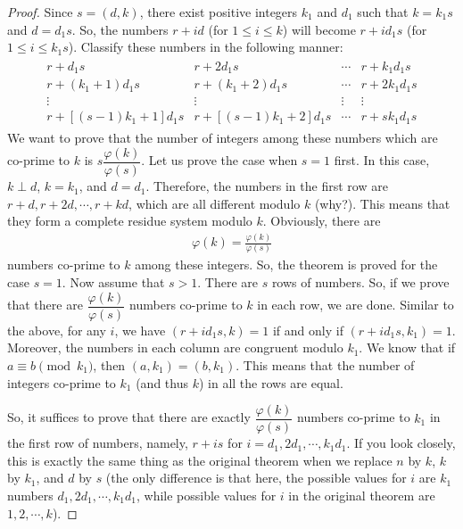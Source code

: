 \begin{proof}
		Since $s=(d,k)$, there exist positive integers $k_1$ and $d_1$ such that $k = k_1s$ and $d = d_1s$. So, the numbers $r+id$ (for $1 \leq  i \leq k$) will become $r+id_1s$ (for $1 \leq i \leq k_1s$). Classify these numbers in the following manner:
			\begin{align*}
			 \begin{matrix}
				 r+d_1s&r+2d_1s&\cdots&r+k_1d_1s\\
				 r+(k_1+1)d_1s&r+(k_1+2)d_1s&\cdots&r+2k_1d_1s\\
				 \vdots&\vdots&\vdots&\vdots\\
				 r+[(s-1)k_1+1]d_1s&r+[(s-1)k_1+2]d_1s&\cdots&r+sk_1d_1s
			 \end{matrix}
			\end{align*}
		We want to prove that the number of integers among these numbers which are co-prime to $k$ is $s \dfrac{\varphi(k)}{\varphi(s)}$. Let us prove the case when $s=1$ first. In this case, $k \perp d$, $k=k_1$, and $d=d_1$. Therefore, the numbers in the first row are $r+d, r+2d, \cdots, r+kd$, which are all different modulo $k$ (why?). This means that they form a complete residue system modulo $k$. Obviously, there are
			\begin{align*}
				\varphi(k) = \frac{\varphi(k)}{\varphi(s)}
			\end{align*}
		numbers co-prime to $k$ among these integers. So, the theorem is proved for the case $s=1$.
		Now assume that $s>1$. There are $s$ rows of numbers. So, if we prove that there are $\dfrac{\varphi(k)}{\varphi(s)}$ numbers co-prime to $k$ in each row, we are done. Similar to the above, for any $i$, we have $(r+id_1s, k)=1$ if and only if $(r+id_1s, k_1)=1$. Moreover, the numbers in each column are congruent modulo $k_1$. We know that if $a \equiv b \pmod{k_1}$, then $(a, k_1) = (b, k_1)$. This means that the number of integers co-prime to $k_1$ (and thus $k$) in all the rows are equal.

		So, it suffices to prove that there are exactly $\dfrac{\varphi(k)}{\varphi(s)}$ numbers co-prime to $k_1$ in the first row of numbers, namely, $r+is$ for $i=d_1,2d_1,\cdots,k_1d_1$. If you look closely, this is exactly the same thing as the original theorem when we replace $n$ by $k$, $k$ by $k_1$, and $d$ by $s$ (the only difference is that here, the possible values for $i$ are $k_1$ numbers $d_1,2d_1,\cdots,k_1d_1$, while possible values for $i$ in the original theorem are $1,2,\cdots,k$).


\end{proof}
